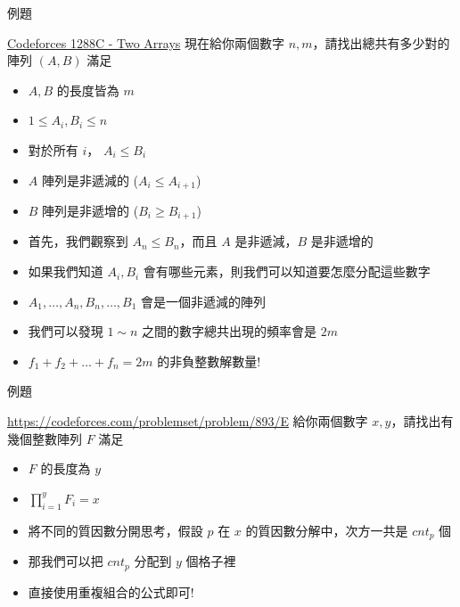\documentclass[aspectratio=169]{beamer}
\begin{document}
    \begin{frame}{例題}
        \begin{block}{\href{https://codeforces.com/problemset/problem/1288/C}{Codeforces 1288C - Two Arrays}}
            現在給你兩個數字 $n,m$，請找出總共有多少對的陣列 $(A,B)$ 滿足
            \begin{itemize}
                \item $A,B$ 的長度皆為 $m$
                \item $1 \le A_i, B_i \le n$
                \item 對於所有 $i$， $A_i \le B_i$
                \item $A$ 陣列是非遞減的 ($A_i \le A_{i+1}$)
                \item $B$ 陣列是非遞增的 ($B_i \ge B_{i+1}$)
            \end{itemize}
        \end{block} \pause
        \begin{itemize}
            \item<1-> 首先，我們觀察到 $A_n \le B_n$，而且 $A$ 是非遞減，$B$ 是非遞增的
            \item<2-> 如果我們知道 $A_i, B_i$ 會有哪些元素，則我們可以知道要怎麼分配這些數字
            \item<3-> $A_1,\dots,A_n,B_n,\dots,B_1$ 會是一個非遞減的陣列
            \item<4-> 我們可以發現 $1 \sim n$ 之間的數字總共出現的頻率會是 $2m$
            \item<5-> $f_1 + f_2 + \dots + f_n = 2m$ 的非負整數解數量!
        \end{itemize}
    \end{frame}
    
    \begin{frame}{例題}
        \begin{block}{\href{Codeforces 893E - Counting Arrays}{https://codeforces.com/problemset/problem/893/E}}
            給你兩個數字 $x,y$，請找出有幾個整數陣列 $F$ 滿足
            \begin{itemize}
                \item $F$ 的長度為 $y$
                \item $\prod^y_{i=1} F_i = x$
            \end{itemize}
        \end{block} \pause
        \begin{itemize}
            \item 將不同的質因數分開思考，假設 $p$ 在 $x$ 的質因數分解中，次方一共是 $cnt_p$ 個
            \item 那我們可以把 $cnt_p$ 分配到 $y$ 個格子裡
            \item 直接使用重複組合的公式即可!
        \end{itemize}
    \end{frame}
    
\end{document}
